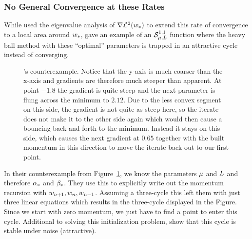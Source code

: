 \subsubsection{No General Convergence at these Rates}

While
\textcite[pp. 65-67]{polyakIntroductionOptimization1987} used the eigenvalue
analysis of \(\nabla\mathcal{L}^2(w_*)\) to extend this rate of convergence
to a local area around \(w_*\), \textcite[pp. 78-79]{lessardAnalysisDesignOptimization2016}
gave an example of an \(\mathcal{S}^{1,1}_{{\mu},{L}}\) function where
the heavy ball method with these ``optimal'' parameters is trapped in an attractive
cycle instead of converging. 
%
\begin{figure}[h]
	\centering
	\def\svgwidth{1\textwidth}
	
	\caption{
		\citeauthor{lessardAnalysisDesignOptimization2016}'s counterexample.
		Notice that the y-axis is much coarser than the x-axis and gradients are
		therefore much steeper than apparent. At point \(-1.8\) the gradient is
		quite steep and the next parameter is flung across the minimum to
		\(2.12\). Due to the less convex segment on this side, the gradient is
		not quite as steep here, so the iterate does not make it to the other
		side again which would then cause a bouncing back and forth to the
		minimum. Instead it stays on this side, which causes the next gradient
		at \(0.65\) together with the built momentum in this direction to move the
		iterate back out to our first point.
	}
	\label{fig: heavy ball counterexample}
\end{figure}

In their counterexample from Figure~\ref{fig: heavy ball counterexample}, we
know the parameters \(\mu\) and \(L\) and therefore \(\alpha_*\)
and \(\beta_*\). They use this to explicitly write out the momentum
recursion with \(w_{n+1}, w_{n}, w_{n-1}\). Assuming a
three-cycle this left them with just three linear equations which results in
the three-cycle displayed in the Figure. Since we start with zero momentum, we
just have to find a point to enter this cycle. Additional to solving this
initialization problem, \textcite[pp.
 93-94]{lessardAnalysisDesignOptimization2016} show that this cycle is
stable under noise (attractive).

